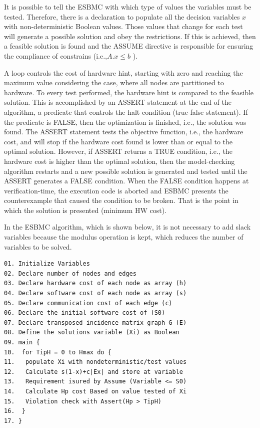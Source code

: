 It is possible to tell the ESBMC with which type of values the variables must be tested. Therefore, there is a declaration to populate all the decision variables $ x $ with non-deterministic Boolean values. Those values that change for each test will generate a possible solution and obey the restrictions. If this is achieved, then a feasible solution is found and the ASSUME directive is responsible for ensuring the compliance of constrains (i.e.,$ A.x \leq b $ ).

A loop controls the cost of hardware hint, starting with zero and reaching the maximum value considering the case, where all nodes are partitioned to hardware. To every test performed, the hardware hint is compared to the feasible solution. This is accomplished by an ASSERT statement at the end of the algorithm, a predicate that controls the halt condition (true-false statement). If the predicate is FALSE, then the optimization is finished, i.e., the solution was found. The ASSERT statement tests the objective function, i.e., the hardware cost, and will stop if the hardware cost found is lower than or equal to the optimal solution. However, if ASSERT returns a TRUE condition, i.e., the hardware cost is higher than the optimal solution, then the model-checking algorithm restarts and a new possible solution is generated and tested until the ASSERT generates a FALSE condition. When the FALSE condition happens at verification-time, the execution code is aborted and ESBMC presents the counterexample that caused the condition to be broken. That is the point in which the solution is presented (minimum HW cost).

In the ESBMC algorithm, which is shown below, it is not necessary to add slack variables because the modulus operation is kept, which reduces the number of variables to be solved. 

\begin{lstlisting}
01. Initialize Variables 
02. Declare number of nodes and edges
03. Declare hardware cost of each node as array (h)
04. Declare software cost of each node as array (s)
05. Declare communication cost of each edge (c)
06. Declare the initial software cost of (S0)
07. Declare transposed incidence matrix graph G (E)
08. Define the solutions variable (Xi) as Boolean
09. main {
10.  for TipH = 0 to Hmax do {
11.   populate Xi with nondeterministic/test values
12.   Calculate s(1-x)+c|Ex| and store at variable
13.   Requirement isured by Assume (Variable <= S0)
14.   Calculate Hp cost Based on value tested of Xi
15.   Violation check with Assert(Hp > TipH)
16.  }
17. }
\end{lstlisting}

